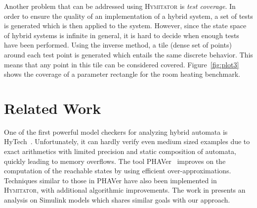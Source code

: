 \documentclass{llncs}
\newcommand{\hytech}{{\sc HyTech}}
\newcommand{\hymitator}{\textsc{Hymitator}}
\newcommand{\phaver}{PHAVer}
\newcommand{\commentaire}[1]{}
\begin{document}
% 


Another problem that can be addressed using \hymitator{} is \emph{test   coverage}.
In order to ensure the quality of an implementation of a hybrid system, a set of tests is generated which is then applied to the system.
However, since the state space of hybrid systems is infinite in general, it is hard to decide when enough tests have been performed.
Using the inverse method, a tile (dense set of points) around each test point is generated which entails the same discrete behavior.
This means that any point in this tile can be considered covered.
Figure~\ref{fig:plot3} shows the coverage of a parameter rectangle for the room heating benchmark.


\commentaire{experiences ?}

\commentaire{rapport d'etudes de cas a rediger}



\section{Related Work}

\vspace{-0.1cm}

One of the first powerful model checkers for analyzing hybrid automata is \hytech{}~\cite{hhw97}.
Unfortunately, it can hardly verify even medium sized examples due to exact arithmetics with limited precision and static composition of automata, quickly leading to memory overflows. The tool \phaver{}~\cite{frehse05} improves on the computation of the reachable states by using efficient over-approximations. Techniques similar to those in \phaver{} have also been implemented in \hymitator{}, with additional algorithmic improvements. The work in \cite{akrs08} presents an analysis on Simulink models which shares similar goals with our approach.
\end{document}
